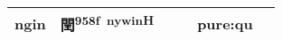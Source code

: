 \documentclass[14pt,a4paper]{scrartcl}
\begin{document}
\begin{longtable}[c]{@{}llllll@{}}
\begin{minipage}[t]{0.14\columnwidth}\raggedright\strut
ngin
\strut\end{minipage} &
\begin{minipage}[t]{0.14\columnwidth}\raggedright\strut
閏\textsuperscript{958f~nywinH}
\strut\end{minipage} &
\begin{minipage}[t]{0.14\columnwidth}\raggedright\strut
\strut\end{minipage} &
\begin{minipage}[t]{0.14\columnwidth}\raggedright\strut
\strut\end{minipage} &
\begin{minipage}[t]{0.14\columnwidth}\raggedright\strut
pure:qu
\strut\end{minipage}\tabularnewline
\bottomrule
\end{longtable}
\end{document}
